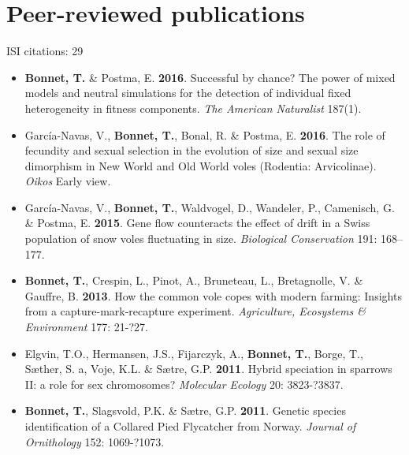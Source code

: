 \documentclass[a4paper,10pt]{article} %
\begin{document}
\section*{Peer-reviewed publications}
ISI citations: 29
\vspace{10pt}
\begin{itemize}
\item \textbf{Bonnet, T.} \& Postma, E. \textbf{2016}. Successful by chance? The power of mixed models and neutral simulations for the detection of individual fixed heterogeneity in fitness components. \textit{The American Naturalist} 187(1).
\item Garc\'{i}a-Navas, V., \textbf{Bonnet, T.}, Bonal, R. \& Postma, E. \textbf{2016}. The role of fecundity and sexual selection in the evolution of size and sexual size dimorphism in New World and Old World voles (Rodentia: Arvicolinae). \textit{Oikos} Early view.
\item Garc\'{i}a-Navas, V., \textbf{Bonnet, T.}, Waldvogel, D., Wandeler, P., Camenisch, G. \& Postma, E. \textbf{2015}. Gene flow counteracts the effect of drift in a Swiss population of snow voles fluctuating in size. \textit{Biological Conservation} 191: 168--177.
\item \textbf{Bonnet, T.}, Crespin, L., Pinot, A., Bruneteau, L., Bretagnolle, V. \& Gauffre, B. \textbf{2013}. How the common vole copes with modern farming: Insights from a capture-mark-recapture experiment. \textit{Agriculture, Ecosystems \& Environment} 177: 21-?27.
\item Elgvin, T.O., Hermansen, J.S., Fijarczyk, A., \textbf{Bonnet, T.}, Borge, T., S{\ae}ther, S. a, Voje, K.L. \& S{\ae}tre, G.P. \textbf{2011}. Hybrid speciation in sparrows II: a role for sex chromosomes? \textit{Molecular Ecology} 20: 3823-?3837.
\item \textbf{Bonnet, T.}, Slagsvold, P.K. \& S{\ae}tre, G.P. \textbf{2011}. Genetic species identification of a Collared Pied Flycatcher from Norway. \textit{Journal of Ornithology} 152: 1069-?1073.
\end{itemize}
\end{document}
